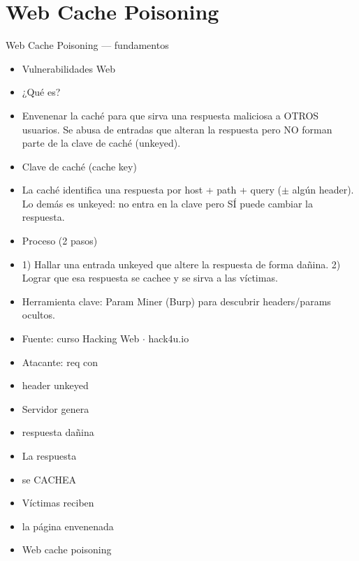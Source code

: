 \documentclass[aspectratio=169,10pt]{beamer}
\begin{document}
\section{Web Cache Poisoning}

\begin{frame}[allowframebreaks]{Web Cache Poisoning --- fundamentos}
\small
  \begin{itemize}
  \item Vulnerabilidades Web
  \item ¿Qué es?
  \item Envenenar la caché para que sirva una respuesta maliciosa a OTROS usuarios. Se abusa de entradas que alteran la respuesta pero NO forman parte de la clave de caché (unkeyed).
  \item Clave de caché (cache key)
  \item La caché identifica una respuesta por host + path + query ($\pm$ algún header). Lo demás es unkeyed: no entra en la clave pero SÍ puede cambiar la respuesta.
  \item Proceso (2 pasos)
  \item 1) Hallar una entrada unkeyed que altere la respuesta de forma dañina. 2) Lograr que esa respuesta se cachee y se sirva a las víctimas.
  \item Herramienta clave: Param Miner (Burp) para descubrir headers/params ocultos.
  \item Fuente: curso Hacking Web $\cdot$ hack4u.io
  \item Atacante: req con
  \item header unkeyed
  \item Servidor genera
  \item respuesta dañina
  \item La respuesta
  \item se CACHEA
  \item Víctimas reciben
  \item la página envenenada
  \item Web cache poisoning
  \end{itemize}
\end{frame}
\end{document}
